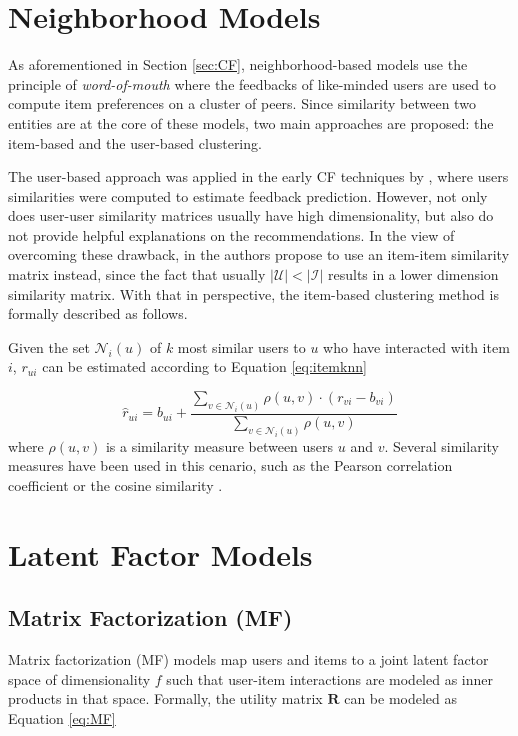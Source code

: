 

\section{Neighborhood Models}

As aforementioned in Section \ref{sec:CF}, neighborhood-based models use the principle of \textit{word-of-mouth} where the feedbacks of like-minded users are used to compute item preferences on a cluster of peers. Since similarity between two entities are at the core of these models, two main approaches are proposed: the item-based and the user-based clustering.

The user-based approach was applied in the early CF techniques by \cite{1999AlgorithmicFramework}, where users similarities were computed to estimate feedback prediction. However, not only does user-user similarity matrices usually have high dimensionality, but also do not provide helpful explanations on the recommendations. In the view of overcoming these drawback, in \cite{2001sarwar} the authors propose to use an item-item similarity matrix instead, since the fact that usually $|\mathcal{U}| < |\mathcal{I}|$ results in a lower dimension similarity matrix. With that in perspective, the item-based clustering method is formally described as follows.

Given the set $\mathcal{N}_i(u)$ of $k$ most similar users to $u$ who have interacted with item $i$, $r_{ui}$ can be estimated according to Equation \ref{eq:itemknn}

\begin{equation} 
    \label{eq:itemknn}
    \hat{r}_{ui} = b_{ui} + \frac{\sum_{v \in \mathcal{N}_i(u)} \rho(u,v)\cdot (r_{vi}-b_{vi})}{\sum_{v \in \mathcal{N}_i(u)} \rho(u,v)}
\end{equation} where $\rho(u,v)$ is a similarity measure between users $u$ and $v$. Several similarity measures have been used in this cenario, such as the Pearson correlation coefficient or the cosine similarity \cite{2010Handbook}.

\section{Latent Factor Models}


\subsection{Matrix Factorization (MF)}
    Matrix factorization (MF) models map users and items to a joint latent factor space of dimensionality $f$ such that user-item interactions are modeled as inner products in that space. Formally, the utility matrix $\mathbf{R}$ can be modeled as Equation \ref{eq:MF}
    

